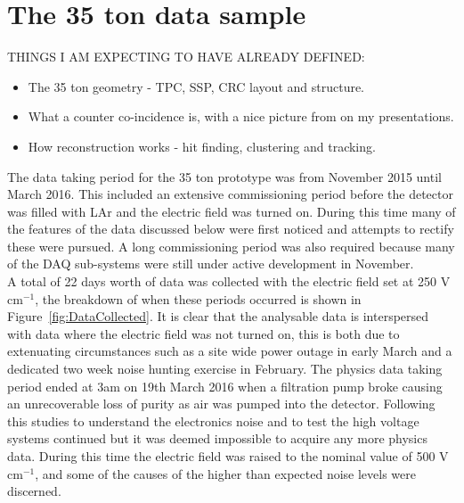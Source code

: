 \chapter{The 35 ton data sample}  %

THINGS I AM EXPECTING TO HAVE ALREADY DEFINED:
\begin{itemize}
\item The 35 ton geometry - TPC, SSP, CRC layout and structure.
\item What a counter co-incidence is, with a nice picture from on my presentations. 
\item How reconstruction works - hit finding, clustering and tracking.
\end{itemize}
  
\graphicspath{{35tonData/Figs/PDF/}{35tonData/Figs/Raster/}{35tonData/Figs/Vector/}}

The data taking period for the 35 ton prototype was from November 2015 until March 2016. This included an extensive commissioning period before the detector was filled with LAr and the electric field was turned on. During this time many of the features of the data discussed below were first noticed and attempts to rectify these were pursued. A long commissioning period was also required because many of the DAQ sub-systems were still under active development in November.\\

A total of 22 days worth of data was collected with the electric field set at 250 V cm$^{-1}$, the breakdown of when these periods occurred is shown in Figure~\ref{fig:DataCollected}. It is clear that the analysable data is interspersed with data where the electric field was not turned on, this is both due to extenuating circumstances such as a site wide power outage in early March and a dedicated two week noise hunting exercise in February. The physics data taking period ended at 3am on 19th March 2016 when a filtration pump broke causing an unrecoverable loss of purity as air was pumped into the detector. Following this studies to understand the electronics noise and to test the high voltage systems continued but it was deemed impossible to acquire any more physics data. During this time the electric field was raised to the nominal value of 500  V cm$^{-1}$, and some of the causes of the higher than expected noise levels were discerned. \\

